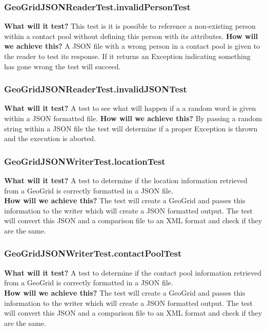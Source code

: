 \documentclass{article}
\begin{document}
\subsubsection{GeoGridJSONReaderTest.invalidPersonTest}
\textbf{What will it test?}
This test is it is possible to reference a non-existing person within a contact pool without defining this person with its attributes. 
\newline
\textbf{How will we achieve this?}
A JSON file with a wrong person in a contact pool is given to the reader to test its response. If it returns an Exception indicating something has gone wrong the test will succeed.

\subsubsection{GeoGridJSONReaderTest.invalidJSONTest}
\textbf{What will it test?}
A test to see what will happen if a a random word is given within a JSON formatted file.
\newline
\textbf{How will we achieve this?}
By passing a random string within a JSON file the test will determine if a proper Exception is thrown and the execution is aborted.

\subsubsection{GeoGridJSONWriterTest.locationTest}
\textbf{What will it test?}
A test to determine if the location information retrieved from a GeoGrid is correctly formatted in a JSON file. \\
\newline
\textbf{How will we achieve this?}
The test will create a GeoGrid and passes this information to the writer which will create a JSON formatted output. The test will convert this JSON and a comparison file to an XML format and check if they are the same.

\subsubsection{GeoGridJSONWriterTest.contactPoolTest}
\textbf{What will it test?}
A test to determine if the contact pool information retrieved from a GeoGrid is correctly formatted in a JSON file.\\
\newline
\textbf{How will we achieve this?}
The test will create a GeoGrid and passes this information to the writer which will create a JSON formatted output. The test will convert this JSON and a comparison file to an XML format and check if they are the same.
\end{document}
